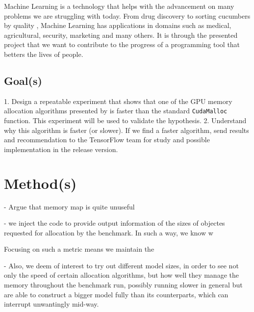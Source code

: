 \documentclass[12pt,twoside]{article}
\begin{document}
Machine Learning is a technology that helps with the advancement on many problems we are struggling with today. From drug discovery \cite{Ramsundar_Kearnes_Riley_Webster_Konerding_Pande_2015} to sorting cucumbers by quality \cite{cucumber}, Machine Learning has applications in domains such as medical, agricultural, security, marketing and many others. It is through the presented project that we want to contribute to the progress of a programming tool that betters the lives of people.

\subsection{Goal(s)}
\label{sec:goal(s)}


1. Design a repeatable experiment that shows that one of the GPU memory allocation algorithms presented by \citeauthor{Vinkler2015} \cite{Vinkler2015} is faster than the standard \texttt{CudaMalloc} function. This experiment will be used to validate the hypothesis. 2. Understand why this algorithm is faster (or slower).
If we find a faster algorithm, send results and recommendation to the TensorFlow team for study and possible implementation in the release version.


\section{Method(s)}
\label{sec:methods}


- Argue that memory map is quite unuseful

-  we inject the code to provide output information of the sizes of objectes requested for allocation by the benchmark. In such a way, we know w

Focusing on such a metric means we maintain the 

- Also, we deem of interest to try out different model sizes, in order to see not only the speed of certain allocation algorithms, but how well they manage the memory throughout the benchmark run, possibly running slower in general but are able to construct a bigger model fully than its counterparts, which can interrupt unwantingly mid-way.
\end{document}
